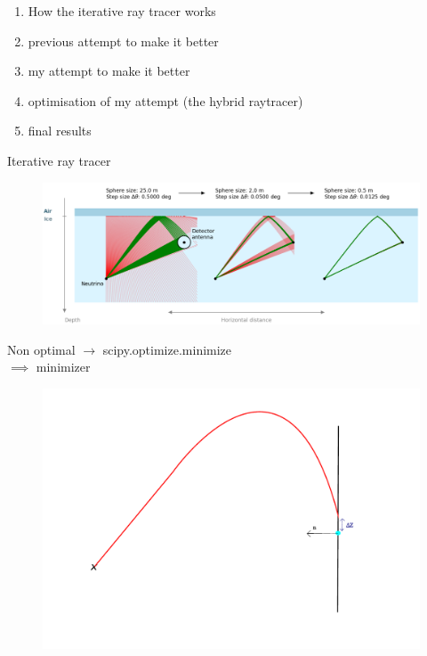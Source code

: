 \documentclass{beamer}
\begin{document}
\begin{frame}
	\begin{enumerate}
		\item How the iterative ray tracer works
		\item previous attempt to make it better
		\item my attempt to make it better
		\item optimisation of my attempt (the hybrid raytracer)
		\item final results
	\end{enumerate}
\end{frame}
\begin{frame}{Iterative ray tracer}
	\begin{figure}
		\includegraphics[width=\textwidth]{figures/iterative_explanation.png}
	\end{figure}
\end{frame}
\begin{frame}
	\centering
	Non optimal $\rightarrow$ scipy.optimize.minimize\\\vspace{1cm}
	$\implies$ minimizer
\end{frame}
\begin{frame}
	\begin{figure}
		\includegraphics[width=\textwidth]{figures/PrincipleIllu.pdf}
	\end{figure}
\end{frame}
\end{document}
